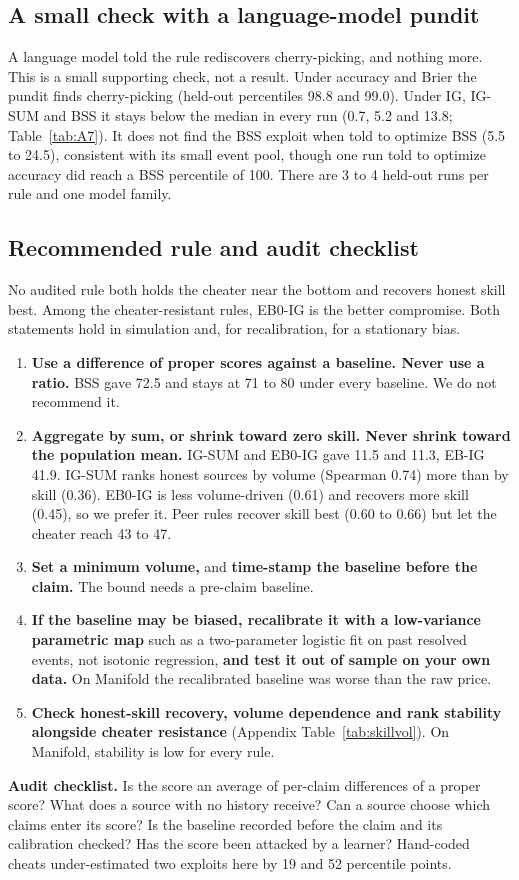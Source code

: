 \documentclass[10pt]{article}
\begin{document}
\subsection{A small check with a language-model pundit}
A language model told the rule rediscovers cherry-picking, and nothing more. This is a small supporting check, not a result. Under accuracy and Brier the pundit finds cherry-picking (held-out percentiles 98.8 and 99.0). Under IG, IG-SUM and BSS it stays below the median in every run (0.7, 5.2 and 13.8; Table~\ref{tab:A7}). It does not find the BSS exploit when told to optimize BSS (5.5 to 24.5), consistent with its small event pool, though one run told to optimize accuracy did reach a BSS percentile of 100. There are 3 to 4 held-out runs per rule and one model family.

\subsection{Recommended rule and audit checklist}
No audited rule both holds the cheater near the bottom and recovers honest skill best. Among the cheater-resistant rules, EB0-IG is the better compromise. Both statements hold in simulation and, for recalibration, for a stationary bias.
\begin{enumerate}\setlength{\itemsep}{1pt}\setlength{\parskip}{0pt}
\item \textbf{Use a difference of proper scores against a baseline. Never use a ratio.} BSS gave 72.5 and stays at 71 to 80 under every baseline. We do not recommend it.
\item \textbf{Aggregate by sum, or shrink toward zero skill. Never shrink toward the population mean.} IG-SUM and EB0-IG gave 11.5 and 11.3, EB-IG 41.9. IG-SUM ranks honest sources by volume (Spearman 0.74) more than by skill (0.36). EB0-IG is less volume-driven (0.61) and recovers more skill (0.45), so we prefer it. Peer rules recover skill best (0.60 to 0.66) but let the cheater reach 43 to 47.
\item \textbf{Set a minimum volume,} and \textbf{time-stamp the baseline before the claim.} The bound needs a pre-claim baseline.
\item \textbf{If the baseline may be biased, recalibrate it with a low-variance parametric map} such as a two-parameter logistic fit on past resolved events, not isotonic regression, \textbf{and test it out of sample on your own data.} On Manifold the recalibrated baseline was worse than the raw price.
\item \textbf{Check honest-skill recovery, volume dependence and rank stability alongside cheater resistance} (Appendix Table~\ref{tab:skillvol}). On Manifold, stability is low for every rule.
\end{enumerate}
\textbf{Audit checklist.} Is the score an average of per-claim differences of a proper score? What does a source with no history receive? Can a source choose which claims enter its score? Is the baseline recorded before the claim and its calibration checked? Has the score been attacked by a learner? Hand-coded cheats under-estimated two exploits here by 19 and 52 percentile points.
\end{document}
